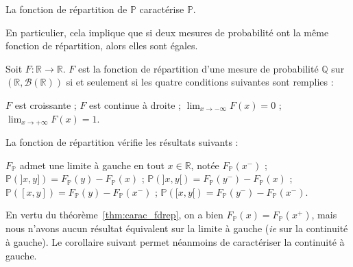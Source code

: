 \documentclass[../integ-proba.tex]{subfiles}
\begin{document}
    \begin{thm}
        La fonction de répartition de $\mathbb{P}$ caractérise $\mathbb{P}$.
    \end{thm}

    \begin{rem}
        En particulier, cela implique que si deux mesures de probabilité ont la même fonction de répartition, alors elles sont égales.
    \end{rem}

    \begin{thm}
        \label{thm:carac_fdrep}
        Soit $F:\mathbb{R} \rightarrow \mathbb{R}$.
        $F$ est la fonction de répartition d'une mesure de probabilité $\mathbb{Q}$ sur $\left( \mathbb{R}, \mathcal{B}(\mathbb{R}) \right)$ si et seulement si les quatre conditions suivantes sont remplies :
        \begin{itemize}
            \itemb $F$ est croissante ;
            \itemb $F$ est continue à droite ;
            \itemb $\lim_{x \to -\infty} F(x) = 0$ ;
            \itemb $\lim_{x \to +\infty} F(x) = 1$.
        \end{itemize}
    \end{thm}

    \begin{prop}
        La fonction de répartition vérifie les résultats suivants :
        \begin{itemize}
            \itemb $F_\mathbb{P}$ admet une limite à gauche en tout $x \in \mathbb{R}$, notée $F_\mathbb{P}(x^-)$ ;
            \itemb $\mathbb{P}(]x,y]) = F_\mathbb{P}(y) - F_\mathbb{P}(x)$ ;
            \itemb $\mathbb{P}(]x,y[) = F_\mathbb{P}(y^-) - F_\mathbb{P}(x)$ ;
            \itemb $\mathbb{P}([x,y]) = F_\mathbb{P}(y) - F_\mathbb{P}(x^-)$ ;
            \itemb $\mathbb{P}([x,y[) = F_\mathbb{P}(y^-) - F_\mathbb{P}(x^-)$.
        \end{itemize}
    \end{prop}

    \begin{rem}
        En vertu du théorème~\ref{thm:carac_fdrep}, on a bien $F_\mathbb{P}(x) = F_\mathbb{P}(x^+)$, mais nous n'avons aucun résultat équivalent sur la limite à gauche (\textit{ie} sur la continuité à gauche).
        Le corollaire suivant permet néanmoins de caractériser la continuité à gauche.
    \end{rem}
\end{document}
